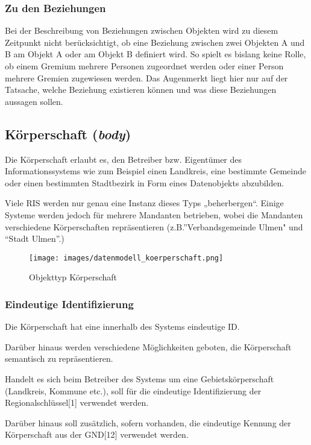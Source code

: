 \documentclass[,a4paper]{article}
\makeatletter
\def\maxwidth{\ifdim\Gin@nat@width>\linewidth\linewidth
\else\Gin@nat@width\fi}
\let\Oldincludegraphics\includegraphics
\renewcommand{\includegraphics}[1]{\Oldincludegraphics[width=\maxwidth]{#1}}
\makeatother
\begin{document}
\subsubsection{Zu den Beziehungen}

Bei der Beschreibung von Beziehungen zwischen Objekten wird zu diesem
Zeitpunkt nicht berücksichtigt, ob eine Beziehung zwischen zwei Objekten
A und B am Objekt A oder am Objekt B definiert wird. So spielt es
bislang keine Rolle, ob einem Gremium mehrere Personen zugeordnet werden
oder einer Person mehrere Gremien zugewiesen werden. Das Augenmerkt
liegt hier nur auf der Tatsache, welche Beziehung existieren können und
was diese Beziehungen aussagen sollen.

\subsection{Körperschaft (\emph{body})}

Die Körperschaft erlaubt es, den Betreiber bzw. Eigentümer des
Informationssystems wie zum Beispiel einen Landkreis, eine bestimmte
Gemeinde oder einen bestimmten Stadtbezirk in Form eines Datenobjekts
abzubilden.

Viele RIS werden nur genau eine Instanz dieses Typs „beherbergen``.
Einige Systeme werden jedoch für mehrere Mandanten betrieben, wobei die
Mandanten verschiedene Körperschaften repräsentieren
(z.B.''Verbandsgemeinde Ulmen" und ``Stadt Ulmen''.)

\begin{figure}[htbp]
\centering
\texttt{[image: images/datenmodell\_koerperschaft.png]}
\caption{Objekttyp Körperschaft}
\end{figure}

\subsubsection{Eindeutige Identifizierung}

Die Körperschaft hat eine innerhalb des Systems eindeutige ID.

Darüber hinaus werden verschiedene Möglichkeiten geboten, die
Körperschaft semantisch zu repräsentieren.

Handelt es sich beim Betreiber des Systems um eine Gebietskörperschaft
(Landkreis, Kommune etc.), soll für die eindeutige Identifizierung der
Regionalschlüssel{[}1{]} verwendet werden.

Darüber hinaus soll zusätzlich, sofern vorhanden, die eindeutige Kennung
der Körperschaft aus der GND{[}12{]} verwendet werden.
\end{document}
